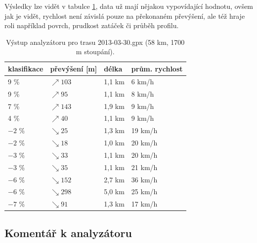 \documentclass[thesis=B,czech]{FITthesis}[2012/06/26]
\begin{document}
Výsledky lze vidět v tabulce \ref{table:vystupAnalyzatoru}, data už mají nějakou vypovídající hodnotu, ovšem jak je vidět, rychlost není závislá pouze na překonaném převýšení, ale též hraje roli například povrch, prudkost zatáček či průběh profilu.

\begin{table}[h!]
\begin{tabular}{l|l|l|l} %
\textbf{klasifikace}	&	\textbf{převýšení [m]}	&	\textbf{délka}	&	\textbf{prům. rychlost}	\\
\hline
9 \%	&	$\nearrow103$	&	1,1 km	&	6 km/h	\\
9 \%	&	$\nearrow95$	&	1,1 km	&	8 km/h	\\
7 \%	&	$\nearrow143$	&	1,9 km	&	9 km/h	\\
4 \%	&	$\nearrow40$	&	1,1 km	&	9 km/h	\\
$-2$ \%	&	$\searrow25$	&	1,3 km	&	19 km/h	\\
$-2$ \%	&	$\searrow18$	&	1,0 km	&	20 km/h	\\
$-3$ \%	&	$\searrow33$	&	1,1 km	&	20 km/h	\\
$-3$ \%	&	$\searrow35$	&	1,1 km	&	21 km/h	\\
$-6$ \%	&	$\searrow152$	&	2,7 km	&	36 km/h	\\
$-6$ \%	&	$\searrow298$	&	5,0 km	&	25 km/h	\\
$-7$ \%	&	$\searrow91$	&	1,3 km	&	17 km/h	 \\
\end{tabular}
\caption{Výstup analyzátoru pro trasu 2013-03-30.gpx (58 km, 1700 m stoupání).}
\label{table:vystupAnalyzatoru}
\end{table}


\subsection{Komentář k analyzátoru}
\end{document}
